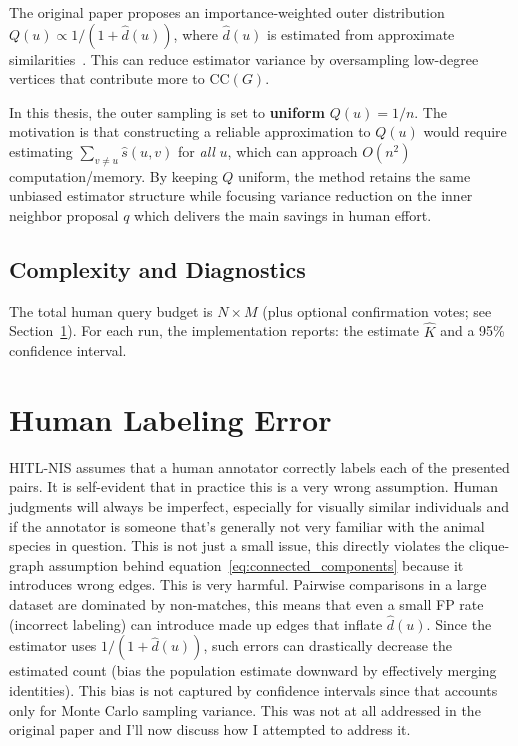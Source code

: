 The original paper proposes an importance-weighted outer distribution \(Q(u)\propto 1/(1+\widehat{d}(u))\), 
where \(\widehat{d}(u)\) is estimated from approximate similarities~\cite{perez2024humanintheloopvisualreidpopulation}. 
This can reduce estimator variance by oversampling low-degree vertices that contribute more to \(\mathrm{CC}(G)\).

In this thesis, the outer sampling is set to \textbf{uniform} \(Q(u)=1/n\). The motivation is that constructing a reliable approximation to \(Q(u)\) would require 
estimating \(\sum_{v\neq u}\widehat{s}(u,v)\) for \emph{all} \(u\), which can approach \(O(n^2)\) computation/memory. By keeping \(Q\) uniform, the method retains the same unbiased estimator structure while focusing variance reduction on the inner neighbor proposal \(q\) which delivers the main savings in human effort. 

\subsection{Complexity and Diagnostics}

The total human query budget is \(N\times M\) (plus optional confirmation votes; see Section~\ref{sec:labeling_error}). For each run, the implementation reports:
the estimate \(\widehat{K}\) and a 95\% confidence interval. 

\section{Human Labeling Error}
\label{sec:labeling_error}

HITL-NIS assumes that a human annotator correctly labels each of the presented pairs. It is self-evident that in practice this is a very wrong assumption. Human judgments will always be imperfect, especially for visually similar individuals and if the annotator is someone that's generally not very familiar with the animal species in question. This is not just a small issue, this directly violates the clique-graph assumption behind equation~\ref{eq:connected_components} because it introduces wrong edges. This is very harmful. Pairwise comparisons in a large dataset are dominated by non-matches, this means that even a small FP rate (incorrect labeling) can introduce made up edges that inflate \(\widehat{d}(u)\). Since the estimator uses \(1/(1+\widehat{d}(u))\), such errors can drastically decrease the estimated count (bias the population estimate downward by effectively merging identities). This bias is not captured by confidence intervals since that accounts only for Monte Carlo sampling variance. This was not at all addressed in the original paper and I'll now discuss how I attempted to address it.  

